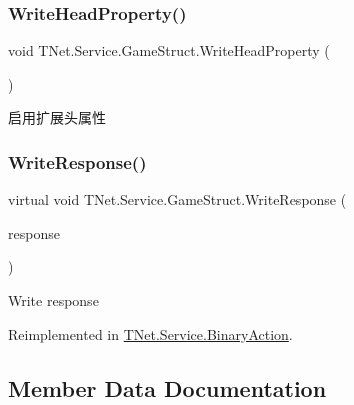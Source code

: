 \subsubsection{\texorpdfstring{Write\+Head\+Property()}{WriteHeadProperty()}}
{\footnotesize\ttfamily void T\+Net.\+Service.\+Game\+Struct.\+Write\+Head\+Property (\begin{DoxyParamCaption}{ }\end{DoxyParamCaption})\hspace{0.3cm}{\ttfamily [protected]}}



启用扩展头属性 

\mbox{\label{class_t_net_1_1_service_1_1_game_struct_a1e9ea47b126ecae6d9b7e1c813d053b2}} 
\subsubsection{\texorpdfstring{Write\+Response()}{WriteResponse()}}
{\footnotesize\ttfamily virtual void T\+Net.\+Service.\+Game\+Struct.\+Write\+Response (\begin{DoxyParamCaption}\item[{\mbox{\hyperlink{class_t_net_1_1_service_1_1_base_game_response}{Base\+Game\+Response}}}]{response }\end{DoxyParamCaption})\hspace{0.3cm}{\ttfamily [virtual]}}



Write response 



Reimplemented in \mbox{\hyperlink{class_t_net_1_1_service_1_1_binary_action_aafac48c10d3e9601ff6a8a77555fc400}{T\+Net.\+Service.\+Binary\+Action}}.



\subsection{Member Data Documentation}
\mbox{\label{class_t_net_1_1_service_1_1_game_struct_a14dcf224eb5a73e2c0b3bee4fe359dd8}} 
